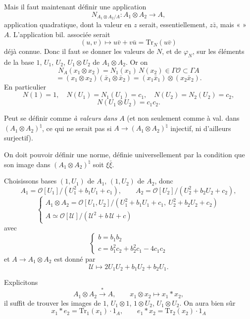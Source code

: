 \documentclass[11pt,a4paper]{article}
\begin{document}
Mais il faut maintenant définir une application
\[
  N_{A_1 \otimes A_2 / A} : A_1 \otimes A_2 \to A ,
\]
application quadratique, dont la valeur en $z$ serait, essentiellement, $z \bar{z}$, mais «  » \ill{} $A$. L'application bil. associée serait
\[
  (u, v) \mapsto u \bar{v} + v \bar{u} = \mathrm{Tr}_N(u \bar{v})
\]
déjà connue. Donc il faut se donner les valeurs de $N$, et de $\varphi_N$, sur les éléments de la base $1$, $U_1$, $U_2$, $U_1 \otimes U_2$ de $A_1 \otimes A_2$. Or on  
\[
  N_A(x_1 \otimes x_2) = N_1(x_1)\, N(x_2) \in \Gamma\mathcal{O} \subset \Gamma A
\]
\[
  = (x_1 \otimes x_2)(\bar{x}_1 \otimes \bar{x}_2) = (x_1 \bar{x}_1) \otimes (x_2 \bar{x}_2) .
\]
En particulier
\[
  N(1) = 1 , \quad N(U_1) = N_1(U_1) = c_1 , \quad N(U_2) = N_2(U_2) = c_2 ,
\]
\[
  N(U_1 \otimes U_2) = c_1 c_2 .
\]

Peut se définir comme \emph{à valeurs dans} $A$ (et non seulement comme à val. dans $(A_1 \otimes A_2)^{\natural}$, ce qui ne serait pas si $A \to (A_1 \otimes A_2)^{\natural}$  \add{\ill{}} injectif, ni d'ailleurs surjectif).

On doit pouvoir définir  une norme, définie universellement par la condition que son image dans $(A_1 \otimes A_2)^{\natural}$ soit $\xi \bar{\xi}$.

Choisissons  bases $(1, U_1)$ de $A_1$, $(1, U_2)$ de $A_2$, donc
\[
  A_1 = \mathcal{O}[U_1] / (U_1^2 + b_1 U_1 + c_1) , \qquad
  A_2 = \mathcal{O}[U_2] / (U_2^2 + b_2 U_2 + c_2) ,
\]
\[
  \begin{cases}
    A_1 \otimes A_2 = \mathcal{O}[U_1, U_2] / (U_1^2 + b_1 U_1 + c_1 ,\ U_2^2 + b_2 U_2 + c_2) \\
    A \simeq \mathcal{O}[\mathcal{U}] / (\mathcal{U}^2 + b\, \mathcal{U} + c)
  \end{cases}
\]
avec
\[
  \begin{cases}
    b = b_1 b_2 \\
    c = b_1^2 c_2 + b_2^2 c_1 - 4 c_1 c_2
  \end{cases}
\]
et $A \to A_1 \otimes A_2$ est donné par
\[
  \mathcal{U} \mapsto 2 U_1 U_2 + b_1 U_2 + b_2 U_1 .
\]

Explicitons
\[
  A_1 \otimes A_2 \xrightarrow{\ *\ } A , \qquad x_1 \otimes x_2 \mapsto x_1 * x_2 ,
\]
il suffit de trouver les images de $1$, $U_1 \otimes 1$, $1 \otimes U_2$, $U_1 \otimes U_2$.
On aura bien sûr
\[
  x_1 * e_2 = \mathrm{Tr}_1(x_1) \cdot 1_A , \qquad
  e_1 * x_2 = \mathrm{Tr}_2(x_2) \cdot 1_A
\]
\end{document}
